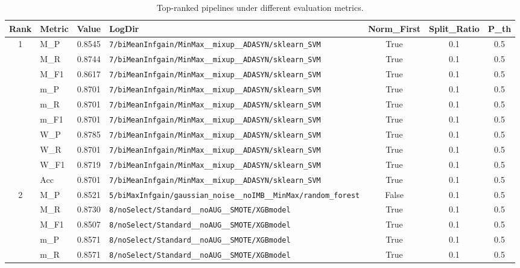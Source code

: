 \begin{table}[htbp]
\caption{Top-ranked pipelines under different evaluation metrics.}
\label{tab:rank_metric_vertical}
\centering
\small
\setlength{\tabcolsep}{4pt}
\begin{tabular}{|c|l|c|>{\ttfamily\footnotesize}p{7.2cm}|c|c|c|}
\hline
Rank & Metric & Value & LogDir & Norm\_First & Split\_Ratio & P\_th \\
\hline
\multirow{10}{*}{1} & M\_P & 0.8545 & \texttt{7/biMeanInfgain/MinMax\_\_mixup\_\_ADASYN/sklearn\_SVM} & True & 0.1 & 0.5 \\
 & M\_R & 0.8744 & \texttt{7/biMeanInfgain/MinMax\_\_mixup\_\_ADASYN/sklearn\_SVM} & True & 0.1 & 0.5 \\
 & M\_F1 & 0.8617 & \texttt{7/biMeanInfgain/MinMax\_\_mixup\_\_ADASYN/sklearn\_SVM} & True & 0.1 & 0.5 \\
 & m\_P & 0.8701 & \texttt{7/biMeanInfgain/MinMax\_\_mixup\_\_ADASYN/sklearn\_SVM} & True & 0.1 & 0.5 \\
 & m\_R & 0.8701 & \texttt{7/biMeanInfgain/MinMax\_\_mixup\_\_ADASYN/sklearn\_SVM} & True & 0.1 & 0.5 \\
 & m\_F1 & 0.8701 & \texttt{7/biMeanInfgain/MinMax\_\_mixup\_\_ADASYN/sklearn\_SVM} & True & 0.1 & 0.5 \\
 & W\_P & 0.8785 & \texttt{7/biMeanInfgain/MinMax\_\_mixup\_\_ADASYN/sklearn\_SVM} & True & 0.1 & 0.5 \\
 & W\_R & 0.8701 & \texttt{7/biMeanInfgain/MinMax\_\_mixup\_\_ADASYN/sklearn\_SVM} & True & 0.1 & 0.5 \\
 & W\_F1 & 0.8719 & \texttt{7/biMeanInfgain/MinMax\_\_mixup\_\_ADASYN/sklearn\_SVM} & True & 0.1 & 0.5 \\
 & Acc & 0.8701 & \texttt{7/biMeanInfgain/MinMax\_\_mixup\_\_ADASYN/sklearn\_SVM} & True & 0.1 & 0.5 \\
\hline
\multirow{10}{*}{2} & M\_P & 0.8521 & \texttt{5/biMaxInfgain/gaussian\_noise\_\_noIMB\_\_MinMax/random\_forest} & False & 0.1 & 0.5 \\
 & M\_R & 0.8730 & \texttt{8/noSelect/Standard\_\_noAUG\_\_SMOTE/XGBmodel} & True & 0.1 & 0.5 \\
 & M\_F1 & 0.8507 & \texttt{8/noSelect/Standard\_\_noAUG\_\_SMOTE/XGBmodel} & True & 0.1 & 0.5 \\
 & m\_P & 0.8571 & \texttt{8/noSelect/Standard\_\_noAUG\_\_SMOTE/XGBmodel} & True & 0.1 & 0.5 \\
 & m\_R & 0.8571 & \texttt{8/noSelect/Standard\_\_noAUG\_\_SMOTE/XGBmodel} & True & 0.1 & 0.5 \\

\end{tabular}
\end{table}
